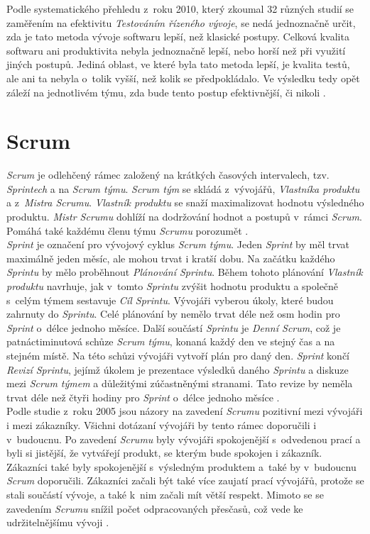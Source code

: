 \documentclass[12pt]{report}
\begin{document}
Podle systematického přehledu z~roku 2010, který zkoumal 32 různých studií se zaměřením na efektivitu \textit{Testováním řízeného vývoje}, se nedá jednoznačně určit, zda je tato metoda vývoje softwaru lepší, než klasické postupy. Celková kvalita softwaru ani produktivita nebyla jednoznačně lepší, nebo horší než při využití jiných postupů. Jediná oblast, ve které byla tato metoda lepší, je kvalita testů, ale ani ta nebyla o~tolik vyšší, než kolik se předpokládalo. Ve výsledku tedy opět záleží na jednotlivém týmu, zda bude tento postup efektivnější, či nikoli \cite{Turhan2010}.

\section{Scrum}

\textit{Scrum} je odlehčený rámec založený na krátkých časových intervalech, tzv. \textit{Sprintech} a na \textit{Scrum týmu}. \textit{Scrum tým} se skládá z~vývojářů, \textit{Vlastníka produktu} a z~\textit{Mistra Scrumu}. \textit{Vlastník produktu} se snaží maximalizovat hodnotu výsledného produktu. \textit{Mistr Scrumu} dohlíží na dodržování hodnot a postupů v~rámci\textit{ Scrum}. Pomáhá také každému členu týmu \textit{Scrumu} porozumět \cite{Schwaber2020}.\\

 \textit{Sprint} je označení pro vývojový cyklus \textit{Scrum týmu}. Jeden \textit{Sprint} by měl trvat maximálně jeden měsíc, ale mohou trvat i kratší dobu. Na začátku každého \textit{Sprintu} by mělo proběhnout \textit{Plánování Sprintu}. Během tohoto plánování \textit{Vlastník produktu} navrhuje, jak v~tomto \textit{Sprintu} zvýšit hodnotu produktu a společně s~celým týmem sestavuje \textit{Cíl Sprintu}. Vývojáři vyberou úkoly, které budou zahrnuty do \textit{Sprintu}. Celé plánování by nemělo trvat déle než osm hodin pro \textit{Sprint} o~délce jednoho měsíce. Další součástí \textit{Sprintu} je \textit{Denní Scrum}, což je patnáctiminutová schůze \textit{Scrum týmu}, konaná každý den ve stejný čas a na stejném místě. Na této schůzi vývojáři vytvoří plán pro daný den. \textit{Sprint} končí \textit{Revizí Sprintu}, jejímž úkolem je prezentace výsledků daného \textit{Sprintu} a diskuze mezi \textit{Scrum týmem} a důležitými zúčastněnými stranami. Tato revize by neměla trvat déle než čtyři hodiny pro \textit{Sprint} o~délce jednoho měsíce \cite{Schwaber2020}.\\
 
Podle studie z~roku 2005 jsou názory na zavedení \textit{Scrumu} pozitivní mezi vývojáři i mezi zákazníky. Všichni dotázaní vývojáři by tento rámec doporučili i v~budoucnu. Po zavedení \textit{Scrumu} byly vývojáři spokojenější s~odvedenou prací a byli si jistější, že vytvářejí produkt, se kterým bude spokojen i zákazník. Zákazníci také byly spokojenější s~výsledným produktem a~také by v~budoucnu \textit{Scrum} doporučili. Zákazníci začali být také více zaujatí prací vývojářů, protože se stali součástí vývoje, a také k~nim začali mít větší respekt. Mimoto se se zavedením \textit{Scrumu} snížil počet odpracovaných přesčasů, což vede ke udržitelnějšímu vývoji \cite{Mann2005}.
\end{document}
